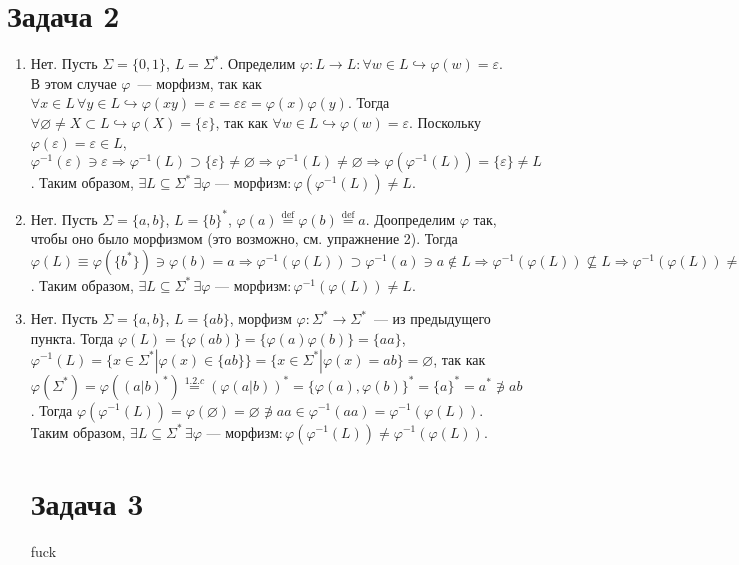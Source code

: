 \documentclass[a4paper]{article}
\newcommand{\niton}{\not\owns}
\begin{document}
\section*{Задача 2}
\begin{enumerate}[1.]
\item Нет. Пусть $\Sigma=\{0,1\}$, $L=\Sigma^*$. Определим $\varphi\colon L\longrightarrow L\colon \forall w\in L\hookrightarrow\varphi(w)=\varepsilon$. В этом случае $\varphi$~--- морфизм, так как $\forall x\in L\,\forall y\in L\hookrightarrow\varphi(xy)=\varepsilon=\varepsilon\varepsilon=\varphi(x)\varphi(y)$. Тогда $\forall \varnothing\neq X\subset L\hookrightarrow\varphi(X)=\{\varepsilon\}$, так как $\forall w\in L\hookrightarrow\varphi(w)=\varepsilon$. Поскольку $\varphi(\varepsilon)=\varepsilon\in L$, $\varphi^{-1}(\varepsilon)\ni\varepsilon\Rightarrow \varphi^{-1}(L)\supset\{\varepsilon\}\neq\varnothing\Rightarrow\varphi^{-1}(L)\neq\varnothing\Rightarrow\varphi(\varphi^{-1}(L))=\{\varepsilon\}\neq L$.\newline
Таким образом, $\exists L\subseteq\Sigma^*\,\exists\varphi\mbox{~--- морфизм}\colon \varphi(\varphi^{-1}(L))\neq L$.
\item Нет. Пусть $\Sigma=\{a,b\}$, $L=\{b\}^*$, $\varphi(a)\overset{\mathrm{def}}{=}\varphi(b)\overset{\mathrm{def}}{=}a$. Доопределим $\varphi$ так, чтобы оно было морфизмом (это возможно, см. упражнение 2). Тогда $\varphi(L)\equiv\varphi(\{b^*\})\ni\varphi(b)=a\Rightarrow\varphi^{-1}(\varphi(L))\supset\varphi^{-1}(a)\ni a\notin L\Rightarrow \varphi^{-1}(\varphi(L))\nsubseteq L\Rightarrow\varphi^{-1}(\varphi(L))\neq L$.\newline
Таким образом, $\exists L\subseteq\Sigma^*\,\exists\varphi\mbox{~--- морфизм}\colon \varphi^{-1}(\varphi(L))\neq L$.
\item Нет. Пусть $\Sigma=\{a,b\}$, $L=\{ab\}$, морфизм $\varphi\colon\Sigma^*\longrightarrow\Sigma^*$~--- из предыдущего пункта. Тогда $\varphi(L)=\{\varphi(ab)\}=\{\varphi(a)\varphi(b)\}=\{aa\}$, $\varphi^{-1}(L)=\{x\in\Sigma^*|\varphi(x)\in\{ab\}\}=\{x\in\Sigma^*|\varphi(x)=ab\}=\varnothing$, так как $\varphi(\Sigma^*)=\varphi((a|b)^*)\overset{1.2.c}{=}(\varphi(a|b))^*=\{\varphi(a),\varphi(b)\}^*=\{a\}^*=a^*\niton ab$. Тогда $\varphi(\varphi^{-1}(L))=\varphi(\varnothing)=\varnothing\niton aa \in\varphi^{-1}(aa)=\varphi^{-1}(\varphi(L))$.\newline
Таким образом, $\exists L\subseteq\Sigma^*\,\exists\varphi\mbox{~--- морфизм}\colon \varphi(\varphi^{-1}(L))\neq \varphi^{-1}(\varphi(L))$.
\section*{Задача 3}
fuck
\end{enumerate}
\end{document}
